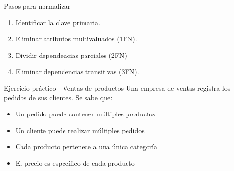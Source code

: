 \documentclass{beamer}
\begin{document}
\begin{frame}{Pasos para normalizar}
    \begin{enumerate}
        \item Identificar la clave primaria.
        \item Eliminar atributos multivaluados (1FN).
        \item Dividir dependencias parciales (2FN).
        \item Eliminar dependencias transitivas (3FN).
    \end{enumerate}
\end{frame}

\begin{frame}{Ejercicio práctico - Ventas de productos}
    Una empresa de ventas registra los pedidos de sus clientes. Se sabe que:
    \begin{itemize}
        \item Un pedido puede contener múltiples productos
        \item Un cliente puede realizar múltiples pedidos
        \item Cada producto pertenece a una única categoría     
        \item El precio es específico de cada producto
    \end{itemize}
    \begin{center}
    \end{center}
\end{frame}
\end{document}
